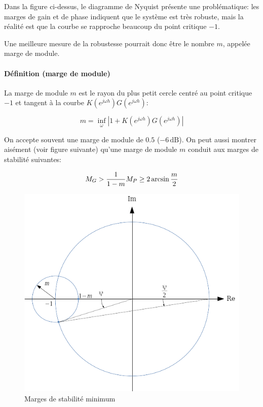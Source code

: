 \documentclass[11pt]{article}
\begin{document}
    Dans la figure ci-dessus, le diagramme de Nyquist présente une
problématique: les marges de gain et de phase indiquent que le système
est très robuste, mais la réalité est que la courbe se rapproche
beaucoup du point critique \(-1\).

Une meilleure mesure de la robustesse pourrait donc être le nombre
\(m\), appelée marge de module.

    \paragraph{Définition (marge de
module)}\label{duxe9finition-marge-de-module}

La marge de module \(m\) est le rayon du plus petit cercle centré au
point critique \(-1\) et tangent à la courbe
\(K(e^{j\omega h})G(e^{j\omega h})\):

\[ m = \inf_{\omega}\left|1 + K(e^{j\omega h})G(e^{j\omega h}) \right| \]

    On accepte souvent une marge de module de \(0.5\)
(\(-6\, \mathrm{dB}\)). On peut aussi montrer aisément (voir figure
suivante) qu'une marge de module \(m\) conduit aux marges de stabilité
suivantes:

\[ M_G > \frac{1}{1-m} \\
   M_P \geq 2\arcsin{\frac{m}{2}}
\]

    \begin{figure}[htbp]
\centering
\includegraphics{Images/Chapter7/margins_min.png}
\caption{Marges de stabilité minimum}
\end{figure}
\end{document}
